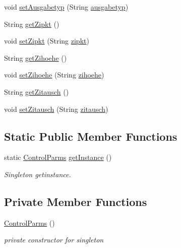 \begin{DoxyCompactItemize}
void \hyperlink{classparams_1_1_control_parms_ae4add7088c814512790397af2e582997}{set\+Ausgabetyp} (String \hyperlink{classparams_1_1_control_parms_a614f382326dedabe279d8c79abf6b507}{ausgabetyp})
\item 
String \hyperlink{classparams_1_1_control_parms_a12aec04726c89c78fffbe2f7c0148cfd}{get\+Zipkt} ()
\item 
void \hyperlink{classparams_1_1_control_parms_afea7f5a4ce364f172fc3dbc4daf9ecd7}{set\+Zipkt} (String \hyperlink{classparams_1_1_control_parms_a5796bbd6b3b407130074d89b85c183d6}{zipkt})
\item 
String \hyperlink{classparams_1_1_control_parms_a3ff4bfa2904c4f485a20f6fb864557b4}{get\+Zihoehe} ()
\item 
void \hyperlink{classparams_1_1_control_parms_ae77b5d713891b289145e548a5c05d67e}{set\+Zihoehe} (String \hyperlink{classparams_1_1_control_parms_a780c529e507f496ccb69f6b9b3ddce62}{zihoehe})
\item 
String \hyperlink{classparams_1_1_control_parms_ab99b444c9b8cfd2b54b384c8e3ad5e7e}{get\+Zitausch} ()
\item 
void \hyperlink{classparams_1_1_control_parms_adb5c016b189b75a4a2e3c1b314769db2}{set\+Zitausch} (String \hyperlink{classparams_1_1_control_parms_afeb9c826d60a837625db477d1e836880}{zitausch})
\end{DoxyCompactItemize}
\subsection*{Static Public Member Functions}
\begin{DoxyCompactItemize}
\item 
static \hyperlink{classparams_1_1_control_parms}{Control\+Parms} \hyperlink{classparams_1_1_control_parms_a34463dd11453c5f45660efaabbe826f7}{get\+Instance} ()
\begin{DoxyCompactList}\small\item\em Singleton getinstance. \end{DoxyCompactList}\end{DoxyCompactItemize}
\subsection*{Private Member Functions}
\begin{DoxyCompactItemize}
\item 
\hyperlink{classparams_1_1_control_parms_a8684e9cf600ad6c4356eeca30133b147}{Control\+Parms} ()
\begin{DoxyCompactList}\small\item\em private constructor for singleton \end{DoxyCompactList}\end{DoxyCompactItemize}
